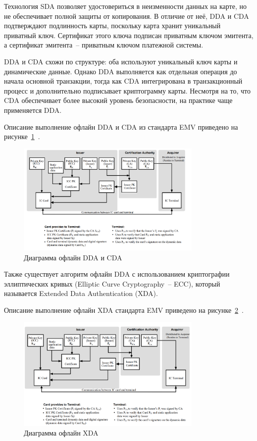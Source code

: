 Технология SDA позволяет удостовериться в неизменности данных на карте, но не обеспечивает полной защиты от копирования.
В отличие от неё, DDA и CDA подтверждают подлинность карты, поскольку карта хранит уникальный приватный ключ.
Сертификат этого ключа подписан приватным ключом эмитента, а сертификат эмитента~-- приватным ключом платежной системы.

DDA и CDA схожи по структуре: оба используют уникальный ключ карты и динамические данные.
Однако DDA выполняется как отдельная операция до начала основной транзакции, тогда как CDA интегрирована в транзакционный процесс и дополнительно подписывает криптограмму карты.
Несмотря на то, что CDA обеспечивает более высокий уровень безопасности, на практике чаще применяется DDA.

Описание выполнение офлайн DDA и CDA из стандарта EMV приведено на рисунке~\ref{fig:emv_offline_dda_cda}~\cite{emv_book_2}.

\begin{figure}[H]
    \centering
    \includegraphics[width=0.8\textwidth]{images/research/emv_offline_dda_cda}
    \caption{\centering Диаграмма офлайн DDA и CDA}
    \label{fig:emv_offline_dda_cda}
\end{figure}

Также существует алгоритм офлайн DDA с использованием криптографии эллиптических кривых (Elliptic Curve Cryptography~-- ECC), который называется
Extended Data Authentication (XDA).

Описание выполнение офлайн XDA стандарта EMV приведено на рисунке~\ref{fig:emv_offline_xda}~\cite{emv_book_2}.

\begin{figure}[H]
    \centering
    \includegraphics[width=0.8\textwidth]{images/research/emv_offline_xda}
    \caption{\centering Диаграмма офлайн XDA}
    \label{fig:emv_offline_xda}
\end{figure}


